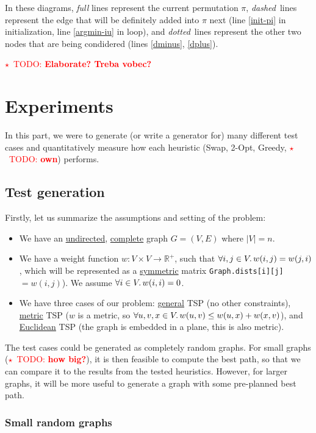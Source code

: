 \documentclass{article}
\newcommand{\todo}[1]{\textcolor{red}{$\star$~TODO: \textbf{#1}}}
\newcommand{\R}{\mathbb{R}}
\newcommand{\uu}[1]{\underline{#1}}
\newcommand{\ii}[1]{\textit{#1}}
\newcommand{\py}[1]{\lstinline[language=Python]{#1}}
\begin{document}
In these diagrams, \ii{full} lines represent the current permutation $\pi$,
\ii{dashed}~lines represent the edge that will be definitely added into $\pi$ next
(line \ref*{init-pi} in initialization, line \ref*{argmin-iu} in loop),
and \ii{dotted}~lines represent the other two nodes that are being condidered
(lines \ref*{dminus}, \ref*{dplus}).

\todo{Elaborate? Treba vobec?}

\section{Experiments}

In this part, we were to generate (or write a generator for) many different
test cases and quantitatively measure how each heuristic (Swap, 2-Opt,
Greedy, \todo{own}) performs.

\subsection{Test generation}

Firstly, let us summarize the assumptions and setting of the problem:
\begin{itemize}
\item We have an \uu{undirected}, \uu{complete} graph $G=(V,E)$ where $|V|=n$.
\item We have a weight function $w:V\times V\to\R^{+}$, such that
  $\forall i,j\in V \ldotp w(i,j) = w(j,i)$, which will be represented as
  a \uu{symmetric} matrix \py{Graph.dists[i][j]}\,$= w(i,j)$).
  We assume $\forall i\in V\ldotp w(i,i)=0$.
\item We have three cases of our problem: \uu{general} TSP
  (no other constraints), \uu{metric} TSP ($w$ is a metric, so
  $\forall u,v,x\in V\ldotp w(u,v)\le w(u,x) + w(x,v)$), and
  \uu{Euclidean} TSP (the graph is embedded in a plane, this is also metric).
\end{itemize}

The test cases could be generated as completely random graphs. For small graphs
(\todo{how big?}), it is then feasible to compute the best path, so that we can
compare it to the results from the tested heuristics. However, for larger graphs,
it will be more useful to generate a graph with some pre-planned best path.

\subsubsection{Small random graphs}
\end{document}
